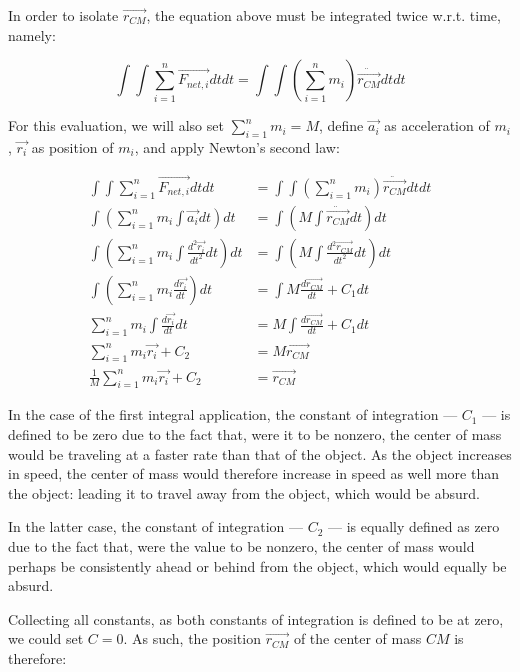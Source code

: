 \documentclass[letterpaper]{article}
\begin{document}
In order to isolate \(\vec{r_{CM}}\), the equation above must be integrated twice w.r.t. time, namely:

\begin{equation}
\int \int \sum^n_{i=1} \vec{F_{net,i}} dt dt = \int \int (\sum^n_{i=1} m_i) \ddot{\vec{r_{CM}}} dt dt
\end{equation}

For this evaluation, we will also set \(\sum^n_{i=1} m_i = M\), define \(\vec{a_i}\) as acceleration of \(m_i\), \(\vec{r_i}\) as position of \(m_i\), and apply Newton's second law:

\begin{align}
\int \int \sum^n_{i=1} \vec{F_{net,i}} dt dt &= \int \int (\sum^n_{i=1} m_i) \ddot{\vec{r_{CM}}} dt dt \\
\int (\sum^n_{i=1} m_i \int \vec{a_i} dt) dt &= \int (M \int \ddot{\vec{r_{CM}}} dt) dt \\
\int (\sum^n_{i=1} m_i \int \frac{d^2\vec{r_i}}{dt^2} dt) dt &= \int (M \int \frac{d^2\vec{r_{CM}}}{dt^2} dt) dt \\
\int (\sum^n_{i=1} m_i \frac{d\vec{r_i}}{dt}) dt &= \int M \frac{d\vec{r_{CM}}}{dt} + C_1 dt \\
\sum^n_{i=1} m_i \int \frac{d\vec{r_i}}{dt} dt &= M \int \frac{d\vec{r_{CM}}}{dt} + C_1 dt \\
\sum^n_{i=1} m_i \vec{r_i} + C_2 &= M \vec{r_{CM}} \\
\frac{1}{M} \sum^n_{i=1} m_i \vec{r_i} + C_2  &= \vec{r_{CM}}
\end{align}

In the case of the first integral application, the constant of integration --- \(C_1\) --- is defined to be zero due to the fact that, were it to be nonzero, the center of mass would be traveling at a faster rate than that of the object. As the object increases in speed, the center of mass would therefore increase in speed as well more than the object: leading it to travel away from the object, which would be absurd.

In the latter case, the constant of integration --- \(C_2\) --- is equally defined as zero due to the fact that, were the value to be nonzero, the center of mass would perhaps be consistently ahead or behind from the object, which would equally be absurd.

Collecting all constants, as both constants of integration is defined to be at zero, we could set \(C=0\). As such, the position \(\vec{r_{CM}}\) of the center of mass \(CM\) is therefore:
\end{document}
